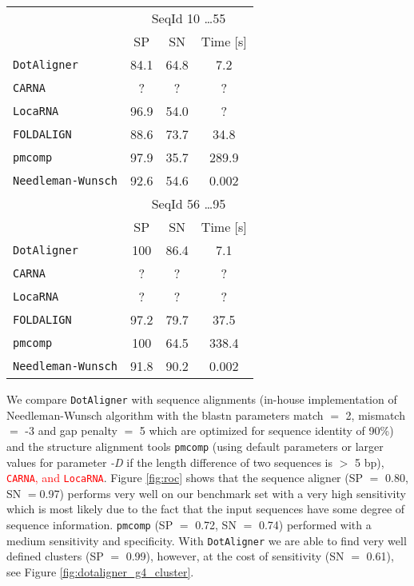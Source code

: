 \documentclass[a4paper,twoside]{article}
\newcommand\dotaligner{\texttt{DotAligner}}
\newcommand\pmcomp{\texttt{pmcomp}}
\newcommand\locarna{\texttt{LocaRNA}}
\newcommand\foldalign{\texttt{FOLDALIGN}}
\newcommand\pvclust{\texttt{pvclust}}
\newcommand\carna{\texttt{CARNA}}
\newcommand\nw{\texttt{Needleman-Wunsch}}
\newcommand{\RED}[1]{\textcolor{red}{#1}}
\newcommand{\GRAY}[1]{\textcolor{mygray}{#1}}
\begin{document}
\begin{tabular}{|l|c|c|c|}
\hline 
 & \multicolumn{3}{c|}{SeqId 10 \ldots 55} \\
 & SP & SN & Time [s] \\ 
\hline 
\dotaligner & 84.1 & 64.8 & 7.2 \\ 
\carna & ? & ? & ? \\ 
\locarna & 96.9 & 54.0 & ? \\ 
\foldalign & 88.6 & 73.7 & 34.8 \\ 
\pmcomp & 97.9 & 35.7 & 289.9 \\ 
\nw & 92.6 & 54.6 & 0.002 \\
\hline 
\hline 
 & \multicolumn{3}{c|}{SeqId 56 \ldots 95} \\
 & SP & SN & Time [s] \\ 
\dotaligner & 100 & 86.4 & 7.1 \\ 
\carna & ? & ? & ? \\ 
\locarna & ? & ? & ? \\ 
\foldalign & 97.2 & 79.7 & 37.5 \\ 
\pmcomp & 100 & 64.5 & 338.4 \\ 
\nw & 91.8 & 90.2 & 0.002 \\
\hline 
\end{tabular} 

\GRAY{We compare \dotaligner{} with sequence alignments (in-house
implementation of Needleman-Wunsch algorithm with the blastn parameters match
$=$ 2, mismatch $=$ -3 and gap penalty $=$ 5 which are optimized for sequence
identity of 90\%) and the structure alignment tools \pmcomp{} (using default
parameters or larger values for parameter \emph{-D} if the length difference of
two sequences is $>$ 5 bp), \RED{\carna, and \locarna}. Figure \ref{fig:roc}
shows that the sequence aligner (SP $=$ 0.80, SN $=$0.97) performs very well on
our benchmark set with a very high sensitivity which is most likely due to the
fact that the input sequences have some degree of sequence information.
\pmcomp{} (SP $=$ 0.72, SN $=$ 0.74) performed with a medium sensitivity and
specificity. With \dotaligner{} we are able to find very well defined clusters (SP
$=$ 0.99), however, at the cost of sensitivity (SN $=$ 0.61), see Figure
\ref{fig:dotaligner_g4_cluster}.}

\begin{figure*}[!ht]
  \centering
  {}
  \caption{\GRAY{Automated hierarchical clustering of 300 sequences from 10 H/ACA
  snoRNA families. The dissimilarity matrix was calculated through \dotaligner{}
  with gap penalty 4. The clustering was conducted by the R-package \pvclust{}
  with multiscale bootstrap resampling with number of bootstrap 1000. We define
  clusters (red rectangles) as Approximately Unbiased (AU) \textit{p}-values $>$
  0.95 rejecting the hypothesis that ``the cluster does not exist`` with
  significance level 0.05.}}
  \label{fig:dotaligner_g4_cluster}
\end{figure*}
\end{document}
